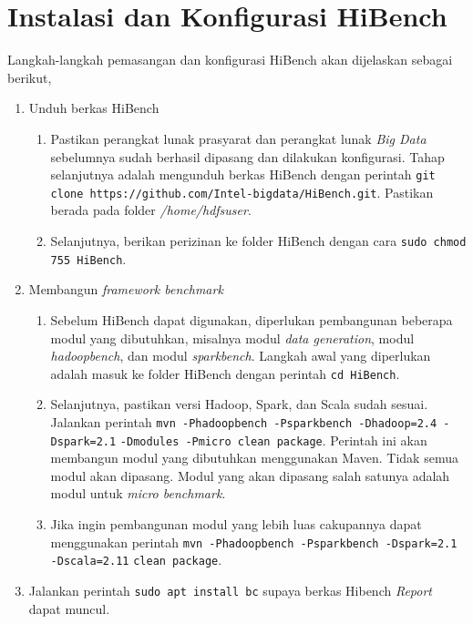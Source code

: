 

\chapter{Instalasi dan Konfigurasi HiBench}
\label{appendix:E}

Langkah-langkah pemasangan dan konfigurasi HiBench akan dijelaskan sebagai berikut,

\begin{enumerate}
  \item Unduh berkas HiBench
  \begin{enumerate}
    \item Pastikan perangkat lunak prasyarat dan perangkat lunak \textit{Big Data} sebelumnya sudah berhasil dipasang dan dilakukan konfigurasi. Tahap selanjutnya adalah mengunduh berkas HiBench dengan perintah \verb|git clone https://github.com/Intel-bigdata/HiBench.git|. Pastikan berada pada folder \textit{/home/hdfsuser}.
    \item Selanjutnya, berikan perizinan ke folder HiBench dengan cara \verb|sudo chmod 755 HiBench|.
  \end{enumerate}
  \item Membangun \textit{framework benchmark}
  \begin{enumerate}
    \item Sebelum HiBench dapat digunakan, diperlukan pembangunan beberapa modul yang dibutuhkan, misalnya modul \textit{data generation}, modul \textit{hadoopbench}, dan modul \textit{sparkbench}. Langkah awal yang diperlukan adalah masuk ke folder HiBench dengan perintah \verb|cd HiBench|.
    \item Selanjutnya, pastikan versi Hadoop, Spark, dan Scala sudah sesuai. Jalankan perintah \verb|mvn -Phadoopbench -Psparkbench -Dhadoop=2.4 -Dspark=2.1| \newline \verb|-Dmodules -Pmicro clean package|. Perintah ini akan membangun modul yang dibutuhkan menggunakan Maven. Tidak semua modul akan dipasang. Modul yang akan dipasang salah satunya adalah modul untuk \textit{micro benchmark}. 
    \item Jika ingin pembangunan modul yang lebih luas cakupannya dapat menggunakan perintah \verb|mvn -Phadoopbench -Psparkbench -Dspark=2.1 -Dscala=2.11| \newline \verb|clean package|.
  \end{enumerate}
  \item Jalankan perintah \verb |sudo apt install bc| supaya berkas Hibench \textit{Report} dapat muncul. 

\end{enumerate}
